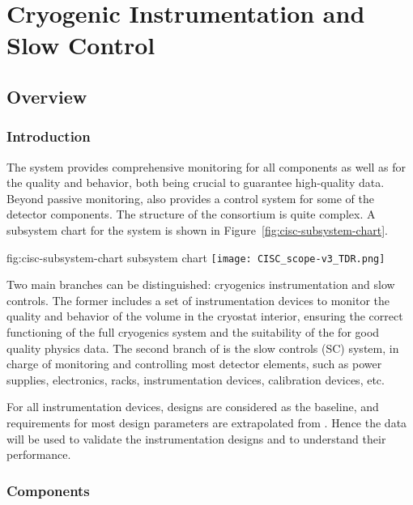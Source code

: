 \chapter{Cryogenic Instrumentation and Slow Control}
\label{ch:sp-cisc}

\section{Overview}

\subsection{Introduction}



The  system provides comprehensive monitoring for all  components as well as for the \lar quality and behavior, both being crucial to guarantee high-quality data. Beyond passive monitoring,  also provides a control system for some of the detector components. The structure of the  consortium is quite
complex. A subsystem chart for the  system is shown in Figure~\ref{fig:cisc-subsystem-chart}. 

\begin{dunefigure}{fig:cisc-subsystem-chart}
  { subsystem chart}
  \texttt{[image: CISC\_scope-v3\_TDR.png]}
\end{dunefigure}

Two main branches can be distinguished: cryogenics instrumentation and slow controls. The former includes a set of instrumentation devices to monitor the quality and behavior of the \lar volume in the cryostat interior, ensuring the correct functioning of the full cryogenics system and the suitability of the \lar for good quality physics data. The second branch of  is the slow controls (SC) system, in charge of monitoring and controlling most detector elements, such as power supplies, electronics, racks, instrumentation devices, calibration devices, etc. 

For all \lar instrumentation devices,  designs are
considered as the baseline, and requirements for most design
parameters are extrapolated from . Hence the  data will be used to validate the instrumentation designs and to understand their performance.

\subsection{Components}

